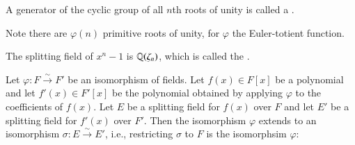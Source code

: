 \documentclass[12pt, a4paper, oneside, openright, titlepage]{book}
\begin{document}
\begin{defn}
    A generator of the cyclic group of all $n$th roots of unity is called a .
\end{defn}

Note there are $\varphi(n)$ primitive roots of unity, for $\varphi$ the Euler-totient function. 

\begin{defn}
    The splitting field of $x^n-1$ is $\mathbb Q(\zeta_n)$, which is called the .
\end{defn}


\begin{thm}
    Let $\varphi:F\xrightarrow{\sim}F'$ be an isomorphism of fields. Let $f(x) \in F[x]$ be a polynomial and let $f'(x) \in F'[x]$ be the polynomial obtained by applying $\varphi$ to the coefficients of $f(x)$. Let $E$ be a splitting field for $f(x)$ over $F$ and let $E'$ be a splitting field for $f'(x)$ over $F'$. Then the isomorphism $\varphi$ extends to an isomorphism $\sigma:E\xrightarrow{\sim}E'$, i.e., restricting $\sigma$ to $F$ is the isomorphsim $\varphi$:
    \begin{center}
    \end{center}
\end{thm}
\end{document}
